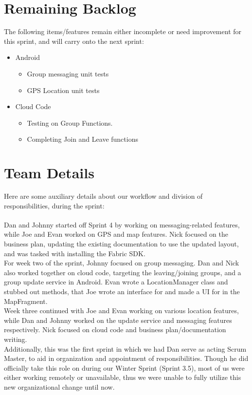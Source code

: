 \documentclass[11pt]{article}
\begin{document}
\section*{Remaining Backlog}
The following items/features remain either incomplete or need improvement for this sprint, and will carry onto the next sprint:
	\begin{itemize}
		\item Android
		\begin{itemize}
			\item Group messaging unit tests
			\item GPS Location unit tests
		\end{itemize}
		\item Cloud Code
		\begin{itemize}
			\item Testing on Group Functions.
			\item Completing Join and Leave functions
		\end{itemize}
	\end{itemize}


	
\section*{Team Details}
Here are some auxiliary details about our workflow and division of responsibilities, during the sprint: \\\\

Dan and Johnny started off Sprint 4 by working on messaging-related features, while Joe and Evan worked on GPS and map features. Nick focused on the business plan, updating the existing documentation to use the updated layout, and was tasked with installing the Fabric SDK.\\

For week two of the sprint, Johnny focused on group messaging. Dan and Nick also worked together on cloud code, targeting the leaving/joining groups, and a group update service in Android. Evan wrote a LocationManager class and stubbed out methods, that Joe wrote an interface for and made a UI for in the MapFragment.\\

Week three continued with Joe and Evan working on various location features, while Dan and Johnny worked on the update service and messaging features respectively. Nick focused on cloud code and business plan/documentation writing.\\

Additionally, this was the first sprint in which we had Dan serve as acting Scrum Master, to aid in organization and appointment of responsibilities. Though he did officially take this role on during our Winter Sprint (Sprint 3.5), most of us were either working remotely or unavailable, thus we were unable to fully utilize this new organizational change until now.
\end{document}
